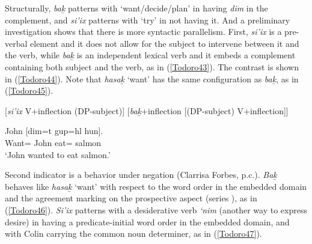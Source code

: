 \documentclass[output=paper]{langscibook}
\begin{document}
Structurally, \emph{bak̲} patterns with ‘want/decide/plan’ in having \emph{dim} in the complement, and \emph{si’ix} patterns with ‘try’ in not having it. And a preliminary investigation shows that there is more syntactic parallelism.
First, \emph{si’ix} is a pre-verbal element and it does not allow for the subject to intervene between it and the verb, while \emph{bak̲} is an independent lexical verb and it embeds a complement containing both subject and the verb, as in (\ref{Todoro43}). The contrast is shown in (\ref{Todoro44}). Note that \emph{hasak̲} ‘want’ has the same configuration as \emph{bak̲}, as in (\ref{Todoro45}). 

\begin{exe}\judgewidth{\#}
\ex \label{Todoro43}
\begin{xlist}

\ex \label{Todoroa}
[\emph{si'ix} 	 V+inflection	(DP-subject)]
\ex \label{Todorob}
[\emph{bak̲}+inflection [(DP-subject) V+inflection]]
\end{xlist}

\ex \label{Todoro44}
\begin{xlist}



\end{xlist}

\ex \label{Todoro45}
 	{John} [{dim=t} 		{gup=hl}        {hun}]. \\
    Want=        John 	eat=     salmon\\
\glt `John wanted to eat salmon.' 
\end{exe}

Second indicator is a behavior  under negation (Clarrisa Forbes, p.c.). \emph{Bak̲}  behaves  like \emph{hasak̲} ‘want’ with respect to the word order in the embedded domain and the agreement marking on the prospective aspect (series ), as in (\ref{Todoro46}). \emph{Si’ix} patterns with a desiderative verb \emph{‘nim} (another way to express desire) in having  a predicate-initial word order in the embedded domain, and with Colin carrying the common noun determiner, as in (\ref{Todoro47}). 
\end{document}
